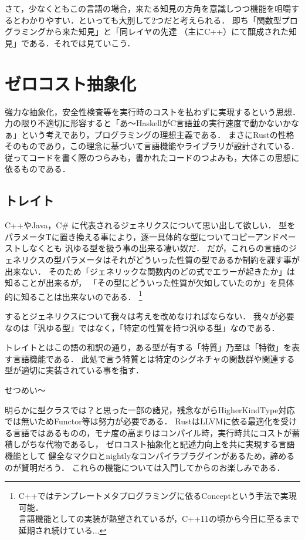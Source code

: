 さて，少なくともこの言語の場合，来たる知見の方角を意識しつつ機能を咀嚼するとわかりやすい．といっても大別して2つだと考えられる．
即ち「関数型プログラミングから来た知見」と「同レイヤの先達 （主にC++）にて醸成された知見」である．それでは見ていこう．

\section{ゼロコスト抽象化}
強力な抽象化，安全性検査等を実行時のコストを払わずに実現するという思想．
力の限り不適切に形容すると「あ〜HaskellがC言語並の実行速度で動かないかなぁ」という考えであり，プログラミングの理想主義である．
まさにRustの性格そのものであり，この理念に基づいて言語機能やライブラリが設計されている．
従ってコードを書く際のつらみも，書かれたコードのつよみも，大体この思想に依るものである．

\subsection{トレイト}
C++やJava，C\# に代表されるジェネリクスについて思い出して欲しい．
型をパラメータTに置き換える事により，逐一具体的な型についてコピーアンドペーストしなくとも
汎ゆる型を扱う事の出来る凄い奴だ．
だが，これらの言語のジェネリクスの型パラメータはそれがどういった性質の型であるか制約を課す事が出来ない．
そのため「ジェネリックな関数内のどの式でエラーが起きたか」は知ることが出来るが，
「その型にどういった性質が欠如していたのか」を具体的に知ることは出来ないのである．
\footnote{C++ではテンプレートメタプログラミングに依るConceptという手法で実現可能．
  \\ 言語機能としての実装が熱望されているが，C++11の頃から今日に至るまで延期され続けている...}

するとジェネリクスについて我々は考えを改めなければならない．
我々が必要なのは「汎ゆる型」ではなく，「特定の性質を持つ汎ゆる型」なのである．

トレイトとはこの語の和訳の通り，ある型が有する「特質」乃至は「特徴」を表す言語機能である．
此処で言う特質とは特定のシグネチャの関数群や関連する型が適切に実装されている事を指す．

せつめい〜

明らかに型クラスでは？と思った一部の諸兄，残念ながらHigherKindType対応では無いためFunctor等は努力が必要である．
RustはLLVMに依る最適化を受ける言語ではあるものの，モナ度の高まりはコンパイル時，実行時共にコストが蓄積しがちな代物であるし，
ゼロコスト抽象化と記述力向上を共に実現する言語機能として
健全なマクロとnightlyなコンパイラプラグインがあるため，諦めるのが賢明だろう．
これらの機能については入門してからのお楽しみである．

